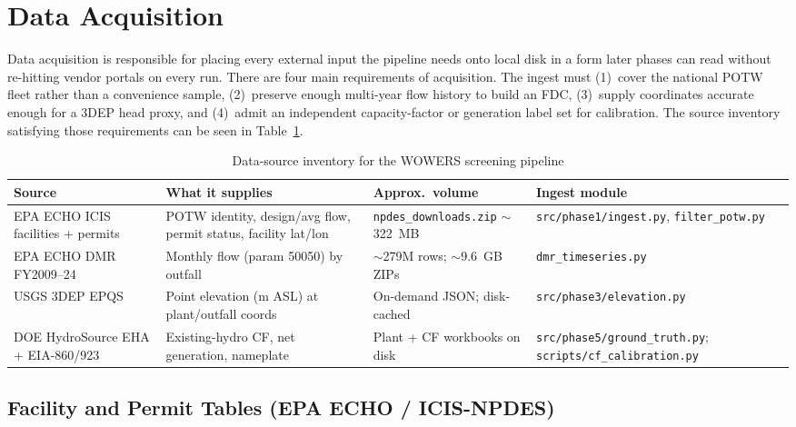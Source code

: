 \documentclass[12pt,letterpaper]{report}
\begin{document}
\section{Data Acquisition}                               %

Data acquisition is responsible for placing every external input the pipeline
needs onto local disk in a form later phases can read without re-hitting vendor
portals on every run. There are four main requirements of acquisition. The
ingest must (1)~cover the national POTW fleet rather than a convenience sample,
(2)~preserve enough multi-year flow history to build an FDC, (3)~supply
coordinates accurate enough for a 3DEP head proxy, and (4)~admit an independent
capacity-factor or generation label set for calibration. The source inventory
satisfying those requirements can be seen in Table~\ref{tab:data_sources}.

\begin{table}[htbp]
  \centering
  \caption{Data-source inventory for the WOWERS screening pipeline}
  \label{tab:data_sources}
  \begin{tabular}{@{}p{2.4cm}p{3.4cm}p{2.6cm}p{3.4cm}@{}}
    \toprule
    Source & What it supplies & Approx.\ volume & Ingest module \\
    \midrule
    EPA ECHO ICIS facilities + permits
      & POTW identity, design/avg flow, permit status, facility lat/lon
      & \texttt{npdes\_downloads.zip} $\sim$322~MB
      & \texttt{src/phase1/ingest.py}, \texttt{filter\_potw.py} \\
    EPA ECHO DMR FY2009--24
      & Monthly flow (param 50050) by outfall
      & $\sim$279M rows; $\sim$9.6~GB ZIPs
      & \texttt{dmr\_timeseries.py} \\
    USGS 3DEP EPQS
      & Point elevation (m ASL) at plant/outfall coords
      & On-demand JSON; disk-cached
      & \texttt{src/phase3/elevation.py} \\
    DOE HydroSource EHA + EIA-860/923
      & Existing-hydro CF, net generation, nameplate
      & Plant + CF workbooks on disk
      & \texttt{src/phase5/ground\_truth.py}; \texttt{scripts/cf\_calibration.py} \\
    \bottomrule
  \end{tabular}
\end{table}

\subsection{Facility and Permit Tables (EPA ECHO / ICIS-NPDES)}
\end{document}
